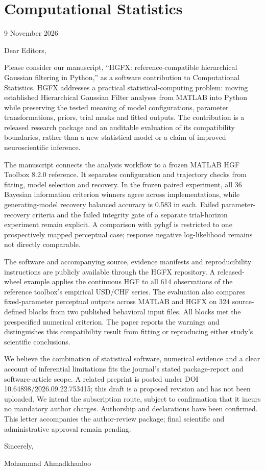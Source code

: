 \documentclass[
  11pt,
]{article}
\author{}
\date{}
\begin{document}
\section{Computational Statistics}\label{computational-statistics}

9 November 2026

Dear Editors,

Please consider our manuscript, ``HGFX: reference-compatible
hierarchical Gaussian filtering in Python,'' as a software contribution
to Computational Statistics. HGFX addresses a practical
statistical-computing problem: moving established Hierarchical Gaussian
Filter analyses from MATLAB into Python while preserving the tested
meaning of model configurations, parameter transformations, priors,
trial masks and fitted outputs. The contribution is a released research
package and an auditable evaluation of its compatibility boundaries,
rather than a new statistical model or a claim of improved
neuroscientific inference.

The manuscript connects the analysis workflow to a frozen MATLAB HGF
Toolbox 8.2.0 reference. It separates configuration and trajectory
checks from fitting, model selection and recovery. In the frozen paired
experiment, all 36 Bayesian information criterion winners agree across
implementations, while generating-model recovery balanced accuracy is
0.583 in each. Failed parameter-recovery criteria and the failed
integrity gate of a separate trial-horizon experiment remain explicit. A
comparison with pyhgf is restricted to one prospectively mapped
perceptual case; response negative log-likelihood remains not directly
comparable.

The software and accompanying source, evidence manifests and
reproducibility instructions are publicly available through the HGFX
repository. A released-wheel example applies the continuous HGF to all
614 observations of the reference toolbox's empirical USD/CHF series.
The evaluation also compares fixed-parameter perceptual outputs across
MATLAB and HGFX on 324 source-defined blocks from two published
behavioral input files. All blocks met the prespecified numerical
criterion. The paper reports the warnings and distinguishes this
compatibility result from fitting or reproducing either study's
scientific conclusions.

We believe the combination of statistical software, numerical evidence
and a clear account of inferential limitations fits the journal's stated
package-report and software-article scope. A related preprint is posted
under DOI 10.64898/2026.09.22.753415; this draft is a proposed revision
and has not been uploaded. We intend the subscription route, subject to
confirmation that it incurs no mandatory author charges. Authorship and
declarations have been confirmed. This letter accompanies the
author-review package; final scientific and administrative approval
remain pending.

Sincerely,

Mohammad Ahmadkhanloo
\end{document}
